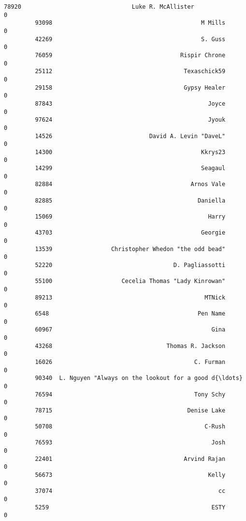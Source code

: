 \documentclass[11pt]{article}
\begin{document}
\begin{Verbatim}[commandchars=\\\{\}]
         78920                                Luke R. McAllister                     0   
         93098                                           M Mills                     0   
         42269                                           S. Guss                     0   
         76059                                     Rispir Chrone                     0   
         25112                                      Texaschick59                     0   
         29158                                      Gypsy Healer                     0   
         87843                                             Joyce                     0   
         97624                                             Jyouk                     0   
         14526                            David A. Levin "DaveL"                     0   
         14300                                           Kkrys23                     0   
         14299                                           Seagaul                     0   
         82884                                        Arnos Vale                     0   
         82885                                          Daniella                     0   
         15069                                             Harry                     0   
         43703                                           Georgie                     0   
         13539                 Christopher Whedon "the odd bead"                     0   
         52220                                   D. Pagliassotti                     0   
         55100                    Cecelia Thomas "Lady Kinrowan"                     0   
         89213                                            MTNick                     0   
         6548                                           Pen Name                     0   
         60967                                              Gina                     0   
         43268                                 Thomas R. Jackson                     0   
         16026                                         C. Furman                     0   
         90340  L. Nguyen "Always on the lookout for a good d{\ldots}                     0   
         76594                                         Tony Schy                     0   
         78715                                       Denise Lake                     0   
         50708                                            C-Rush                     0   
         76593                                              Josh                     0   
         22401                                      Arvind Rajan                     0   
         56673                                             Kelly                     0   
         37074                                                cc                     0   
         5259                                               ESTY                     0   
         

\end{Verbatim}
\end{document}
